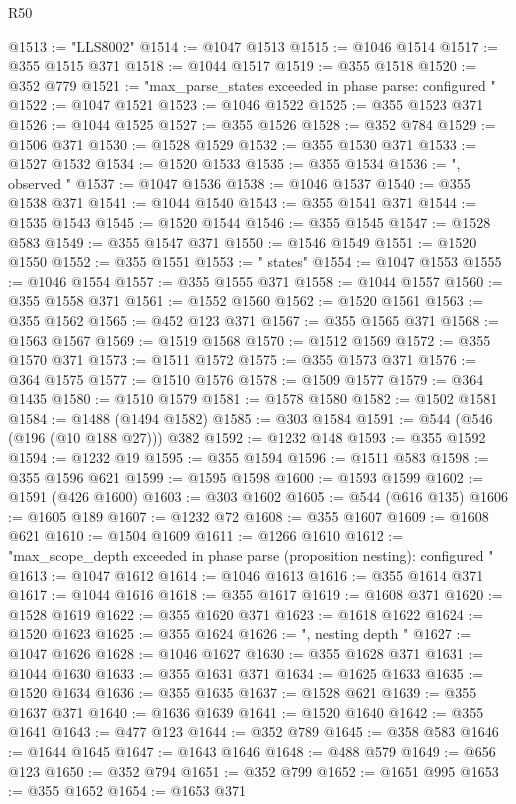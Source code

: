 \begin{lexlean}{R50}
\begin{coremodule}
@1513 := "LLS8002"
@1514 := @1047 @1513
@1515 := @1046 @1514
@1517 := @355 @1515 @371
@1518 := @1044 @1517
@1519 := @355 @1518
@1520 := @352 @779
@1521 := "max_parse_states exceeded in phase parse: configured "
@1522 := @1047 @1521
@1523 := @1046 @1522
@1525 := @355 @1523 @371
@1526 := @1044 @1525
@1527 := @355 @1526
@1528 := @352 @784
@1529 := @1506 @371
@1530 := @1528 @1529
@1532 := @355 @1530 @371
@1533 := @1527 @1532
@1534 := @1520 @1533
@1535 := @355 @1534
@1536 := ", observed "
@1537 := @1047 @1536
@1538 := @1046 @1537
@1540 := @355 @1538 @371
@1541 := @1044 @1540
@1543 := @355 @1541 @371
@1544 := @1535 @1543
@1545 := @1520 @1544
@1546 := @355 @1545
@1547 := @1528 @583
@1549 := @355 @1547 @371
@1550 := @1546 @1549
@1551 := @1520 @1550
@1552 := @355 @1551
@1553 := " states"
@1554 := @1047 @1553
@1555 := @1046 @1554
@1557 := @355 @1555 @371
@1558 := @1044 @1557
@1560 := @355 @1558 @371
@1561 := @1552 @1560
@1562 := @1520 @1561
@1563 := @355 @1562
@1565 := @452 @123 @371
@1567 := @355 @1565 @371
@1568 := @1563 @1567
@1569 := @1519 @1568
@1570 := @1512 @1569
@1572 := @355 @1570 @371
@1573 := @1511 @1572
@1575 := @355 @1573 @371
@1576 := @364 @1575
@1577 := @1510 @1576
@1578 := @1509 @1577
@1579 := @364 @1435
@1580 := @1510 @1579
@1581 := @1578 @1580
@1582 := @1502 @1581
@1584 := @1488 (@1494 @1582)
@1585 := @303 @1584
@1591 := @544 (@546 (@196 (@10 @188 @27))) @382
@1592 := @1232 @148
@1593 := @355 @1592
@1594 := @1232 @19
@1595 := @355 @1594
@1596 := @1511 @583
@1598 := @355 @1596 @621
@1599 := @1595 @1598
@1600 := @1593 @1599
@1602 := @1591 (@426 @1600)
@1603 := @303 @1602
@1605 := @544 (@616 @135)
@1606 := @1605 @189
@1607 := @1232 @72
@1608 := @355 @1607
@1609 := @1608 @621
@1610 := @1504 @1609
@1611 := @1266 @1610
@1612 := "max_scope_depth exceeded in phase parse (proposition nesting): configured "
@1613 := @1047 @1612
@1614 := @1046 @1613
@1616 := @355 @1614 @371
@1617 := @1044 @1616
@1618 := @355 @1617
@1619 := @1608 @371
@1620 := @1528 @1619
@1622 := @355 @1620 @371
@1623 := @1618 @1622
@1624 := @1520 @1623
@1625 := @355 @1624
@1626 := ", nesting depth "
@1627 := @1047 @1626
@1628 := @1046 @1627
@1630 := @355 @1628 @371
@1631 := @1044 @1630
@1633 := @355 @1631 @371
@1634 := @1625 @1633
@1635 := @1520 @1634
@1636 := @355 @1635
@1637 := @1528 @621
@1639 := @355 @1637 @371
@1640 := @1636 @1639
@1641 := @1520 @1640
@1642 := @355 @1641
@1643 := @477 @123
@1644 := @352 @789
@1645 := @358 @583
@1646 := @1644 @1645
@1647 := @1643 @1646
@1648 := @488 @579
@1649 := @656 @123
@1650 := @352 @794
@1651 := @352 @799
@1652 := @1651 @995
@1653 := @355 @1652
@1654 := @1653 @371

\end{coremodule}
\end{lexlean}
